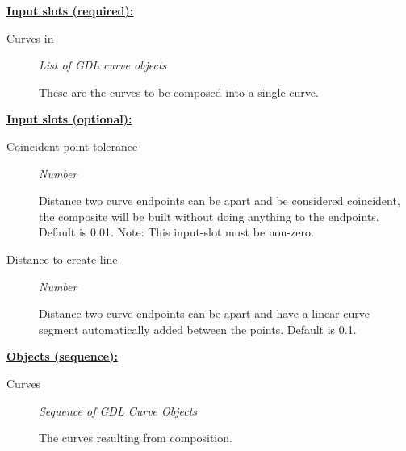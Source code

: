 \documentclass [11pt]{book}
\begin{document}
\begin{itemize}
\begin{description}
\end{description}








\textbf{
\underline{Input slots (required):}}

\begin{description}

\item [Curves-in]
\emph{List of GDL curve objects}

 These are the curves to be composed into a single curve.




\end{description}






\textbf{
\underline{Input slots (optional):}}

\begin{description}

\item [Coincident-point-tolerance]
\emph{Number}

 Distance two curve endpoints can be apart and be considered coincident, the composite will be built
without doing anything to the endpoints. Default is 0.01. Note: This input-slot must be non-zero.




\item [Distance-to-create-line]
\emph{Number}

 Distance two curve endpoints can be apart and have a linear curve segment automatically added between the points. Default is 0.1.




\end{description}






\textbf{
\underline{Objects (sequence):}}

\begin{description}

\item [Curves]
\emph{Sequence of GDL Curve Objects}

 The curves resulting from composition.





\end{description}
\end{itemize}
\end{document}
